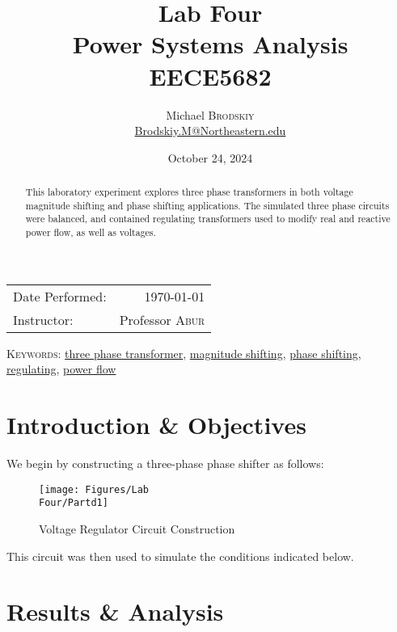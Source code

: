 \documentclass[
	letterpaper, %
	10pt, %
]{CSUniSchoolLabReport}
\title{Lab Four\\ Power Systems Analysis \\ EECE5682} %
\author{Michael \textsc{Brodskiy}\\ \small \href{mailto:Brodskiy.M@Northeastern.edu}{Brodskiy.M@Northeastern.edu}}
\date{October 24, 2024} %
\begin{document}
\maketitle %

\begin{center}
	\begin{tabular}{l r}
		Date Performed: & \today \\ %
		Instructor: & Professor \textsc{Abur} \\ %
	\end{tabular}
\end{center}

\newpage

\begin{abstract}

  This laboratory experiment explores three phase transformers in both voltage magnitude shifting and phase shifting applications. The simulated three phase circuits were balanced, and contained regulating transformers used to modify real and reactive power flow, as well as voltages.

\end{abstract}

\begin{flushleft}

  \textsc{Keywords:} \underline{three phase transformer}, \underline{magnitude shifting}, \underline{phase shifting}, \underline{regulating}, \underline{power flow}

\end{flushleft}

\newpage

\section{Introduction \& Objectives}

We begin by constructing a three-phase phase shifter as follows:

\begin{figure}[H]
  \centering
  \texttt{[image: Figures/Lab\\ Four/Partd1]}
  \caption{Voltage Regulator Circuit Construction}
  \label{fig:1}
\end{figure}

This circuit was then used to simulate the conditions indicated below.

\section{Results \& Analysis} 
\end{document}
